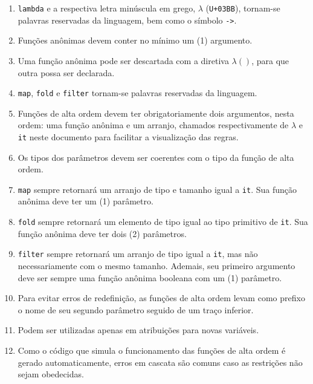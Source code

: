 \documentclass{sftex/sftex}
\newenvironment{smallenum}{
    \vspace{-1mm}
    \begin{enumerate}[label=\roman*.]
    \setlength{\parskip}{0pt}
    \setlength{\itemsep}{2pt}
}{
    \vspace{-2mm}
    \end{enumerate}
}
\begin{document}
\begin{smallenum}

\item \verb!lambda! e a respectiva letra minúscula em grego, $\lambda$
    (\verb!U+03BB!), tornam-se palavras reservadas da linguagem, bem como
    o símbolo \verb!->!.

\item Funções anônimas devem conter no mínimo um (1) argumento.

\item Uma função anônima pode ser descartada com a diretiva
    \texttt{$\lambda()$}, para que outra possa ser declarada.

\item \verb!map!, \verb!fold! e \verb!filter! tornam-se palavras
    reservadas da linguagem.

\item Funções de alta ordem devem ter obrigatoriamente dois argumentos,
    nesta ordem: uma função anônima e um arranjo, chamados respectivamente
    de \texttt{$\lambda$} e \verb!it! neste documento para facilitar a
    visualização das regras.

\item Os tipos dos parâmetros devem ser coerentes com o tipo da função de alta
    ordem.

\item \verb!map! sempre retornará um arranjo de tipo e tamanho
    igual a \verb!it!. Sua função anônima deve ter um (1) parâmetro.

\item \verb!fold! sempre retornará um elemento de tipo igual ao tipo
    primitivo de \verb!it!. Sua função anônima deve ter dois (2) parâmetros.

\item \verb!filter! sempre retornará um arranjo de tipo igual a
    \verb!it!, mas não necessariamente com o mesmo tamanho. Ademais,
    seu primeiro argumento deve ser sempre uma função anônima booleana
    com um (1) parâmetro.

\item Para evitar erros de redefinição, as funções de alta ordem levam como
    prefixo o nome de seu segundo parâmetro seguido de um traço inferior.

\item Podem ser utilizadas apenas em atribuições para novas variáveis.

\item Como o código que simula o funcionamento das funções de alta ordem
    é gerado automaticamente, erros em cascata são comuns caso as restrições
    não sejam obedecidas.

\end{smallenum}
\end{document}
